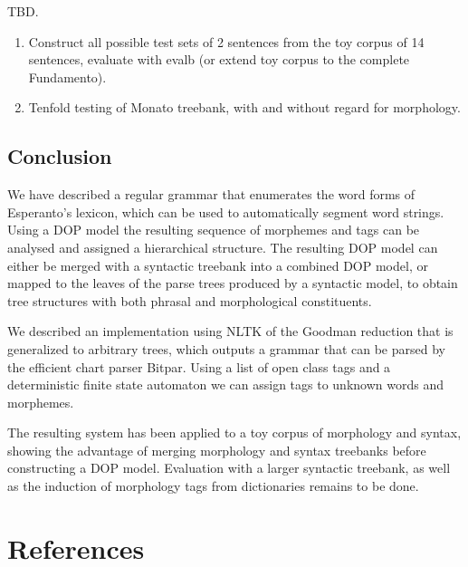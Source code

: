\documentclass[10pt,a4paper]{article}
\begin{document}
TBD. 

\begin{enumerate}
\item Construct all possible test sets of 2 sentences from the toy corpus of 14
sentences, evaluate with evalb (or extend toy corpus to the complete
Fundamento).
\item Tenfold testing of Monato treebank, with and without regard for morphology.
\end{enumerate}

\subsection{Conclusion}

We have described a regular grammar that enumerates the word forms of
Esperanto's lexicon, which can be used to automatically segment word strings.
Using a DOP model the resulting sequence of morphemes and tags can be analysed
and assigned a hierarchical structure. The resulting DOP model can either be
merged with a syntactic treebank into a combined DOP model, or mapped to the
leaves of the parse trees produced by a syntactic model, to obtain tree
structures with both phrasal and morphological constituents.

We described an implementation using NLTK of the Goodman reduction that is
generalized to arbitrary trees, which outputs a grammar that can be parsed by
the efficient chart parser Bitpar. Using a list of open class tags and a
deterministic finite state automaton we can assign tags to unknown words and
morphemes.

The resulting system has been applied to a toy corpus of morphology and
syntax, showing the advantage of merging morphology and syntax treebanks
before constructing a DOP model. Evaluation with a larger syntactic treebank,
as well as the induction of morphology tags from dictionaries remains to be
done.


\section{References}
\end{document}
